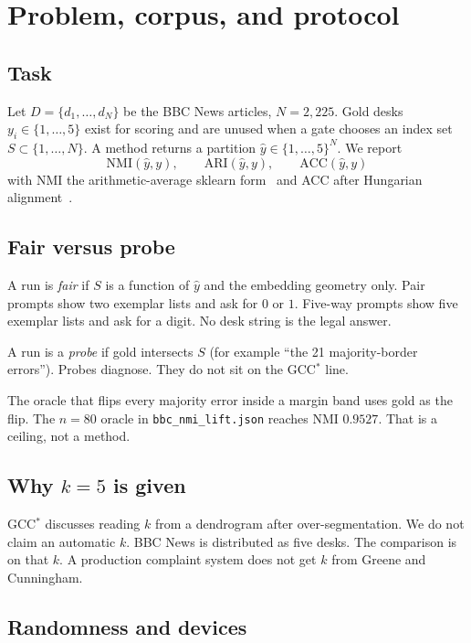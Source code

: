 \documentclass[11pt,a4paper]{article}
\begin{document}
\section{Problem, corpus, and protocol}

\subsection{Task}

Let $D=\{d_1,\ldots,d_N\}$ be the BBC News articles,
$N=2{,}225$. Gold desks $y_i\in\{1,\ldots,5\}$ exist for
scoring and are unused when a gate chooses an index set
$S\subset\{1,\ldots,N\}$. A method returns a partition
$\hat{y}\in\{1,\ldots,5\}^N$. We report
\[
\mathrm{NMI}(\hat{y},y),\qquad
\mathrm{ARI}(\hat{y},y),\qquad
\mathrm{ACC}(\hat{y},y)
\]
with NMI the arithmetic-average sklearn form~\cite{vinh2010nmi}
and ACC after Hungarian alignment~\cite{kuhn1955hungarian}.

\subsection{Fair versus probe}

A run is \emph{fair} if $S$ is a function of $\hat{y}$ and the
embedding geometry only. Pair prompts show two exemplar lists
and ask for $0$ or $1$. Five-way prompts show five exemplar
lists and ask for a digit. No desk string is the legal answer.

A run is a \emph{probe} if gold intersects $S$ (for example
``the 21 majority-border errors''). Probes diagnose. They do
not sit on the GCC$^*$ line.

The oracle that flips every majority error inside a margin
band uses gold as the flip. The $n=80$ oracle in
\texttt{bbc\_nmi\_lift.json} reaches NMI $0.9527$. That is a
ceiling, not a method.

\subsection{Why $k=5$ is given}

GCC$^*$ discusses reading $k$ from a dendrogram after
over-segmentation. We do not claim an automatic $k$. BBC News
is distributed as five desks. The comparison is on that $k$.
A production complaint system does not get $k$ from Greene and
Cunningham.

\subsection{Randomness and devices}
\end{document}
